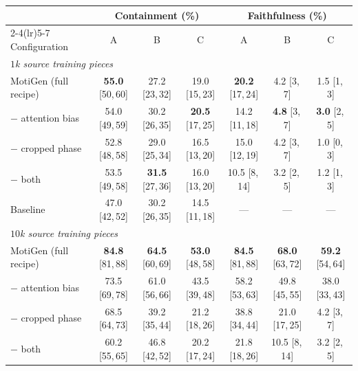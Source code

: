 \documentclass{article}
\newcommand{\method}{MotiGen}
\begin{document}
\begin{table}[h]
  \centering
  \small
  \begin{tabular}{lcccccc}
    \toprule
    & \multicolumn{3}{c}{Containment (\%)} & \multicolumn{3}{c}{Faithfulness (\%)} \\
    \cmidrule(lr){2-4}\cmidrule(lr){5-7}
    Configuration & A & B & C & A & B & C \\

    \midrule
    \multicolumn{7}{l}{\emph{$1$k source training pieces}} \\
    \method{} (full recipe)      & \textbf{55.0} {\tiny[50,\,60]} & 27.2 {\tiny[23,\,32]} & 19.0 {\tiny[15,\,23]} & \textbf{20.2} {\tiny[17,\,24]} & 4.2 {\tiny[3,\,7]} & 1.5 {\tiny[1,\,3]} \\
    \quad $-$ attention bias     & 54.0 {\tiny[49,\,59]} & 30.2 {\tiny[26,\,35]} & \textbf{20.5} {\tiny[17,\,25]} & 14.2 {\tiny[11,\,18]} & \textbf{4.8} {\tiny[3,\,7]} & \textbf{3.0} {\tiny[2,\,5]} \\
    \quad $-$ cropped phase      & 52.8 {\tiny[48,\,58]} & 29.0 {\tiny[25,\,34]} & 16.5 {\tiny[13,\,20]} & 15.0 {\tiny[12,\,19]} & 4.2 {\tiny[3,\,7]} & 1.0 {\tiny[0,\,3]} \\
    \quad $-$ both               & 53.5 {\tiny[49,\,58]} & \textbf{31.5} {\tiny[27,\,36]} & 16.0 {\tiny[13,\,20]} & 10.5 {\tiny[8,\,14]} & 3.2 {\tiny[2,\,5]} & 1.2 {\tiny[1,\,3]} \\
    \quad Baseline               & 47.0 {\tiny[42,\,52]} & 30.2 {\tiny[26,\,35]} & 14.5 {\tiny[11,\,18]} & --- & --- & --- \\
    \midrule
    \multicolumn{7}{l}{\emph{$10$k source training pieces}} \\
    \method{} (full recipe)      & \textbf{84.8} {\tiny[81,\,88]} & \textbf{64.5} {\tiny[60,\,69]} & \textbf{53.0} {\tiny[48,\,58]} & \textbf{84.5} {\tiny[81,\,88]} & \textbf{68.0} {\tiny[63,\,72]} & \textbf{59.2} {\tiny[54,\,64]} \\
    \quad $-$ attention bias     & 73.5 {\tiny[69,\,78]} & 61.0 {\tiny[56,\,66]} & 43.5 {\tiny[39,\,48]} & 58.2 {\tiny[53,\,63]} & 49.8 {\tiny[45,\,55]} & 38.0 {\tiny[33,\,43]} \\
    \quad $-$ cropped phase      & 68.5 {\tiny[64,\,73]} & 39.2 {\tiny[35,\,44]} & 21.2 {\tiny[18,\,26]} & 38.8 {\tiny[34,\,44]} & 21.0 {\tiny[17,\,25]} & 4.2 {\tiny[3,\,7]} \\
    \quad $-$ both               & 60.2 {\tiny[55,\,65]} & 46.8 {\tiny[42,\,52]} & 20.2 {\tiny[17,\,24]} & 21.8 {\tiny[18,\,26]} & 10.5 {\tiny[8,\,14]} & 3.2 {\tiny[2,\,5]} \\

\end{tabular}
\end{table}
\end{document}
